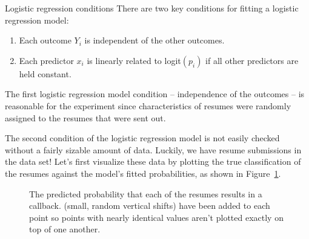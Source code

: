 \begin{onebox}{Logistic regression conditions}
There are two key conditions for fitting a logistic regression model:\vspace{-1mm}
\begin{enumerate}
\setlength{\itemsep}{0mm}
\item
    Each outcome $Y_i$ is independent of the other outcomes.
\item
    Each predictor $x_i$ is linearly related to logit$(p_i)$
    if all other predictors are held constant.
\end{enumerate}
\end{onebox}

The first logistic regression model condition
-- independence of the outcomes --
is reasonable for the experiment since characteristics
of resumes were randomly assigned to the resumes that
were sent out.

The second condition of the logistic regression model is
not easily checked without a fairly sizable amount of data.
Luckily, we have \resN{} resume submissions in the data set!
Let's first visualize these data by plotting the true
classification of the resumes against the model's fitted
probabilities, as shown in
Figure~\ref{logisticModelPredict}.

\begin{figure}[h]
  \centering
  \caption{The predicted probability that each of the
      \resN{} resumes results in a callback.
      (small, random vertical shifts) have been added
      to each point so points with nearly identical
      values aren't plotted exactly on top of one another.}
  \label{logisticModelPredict}
\end{figure}

\D{\newpage}

